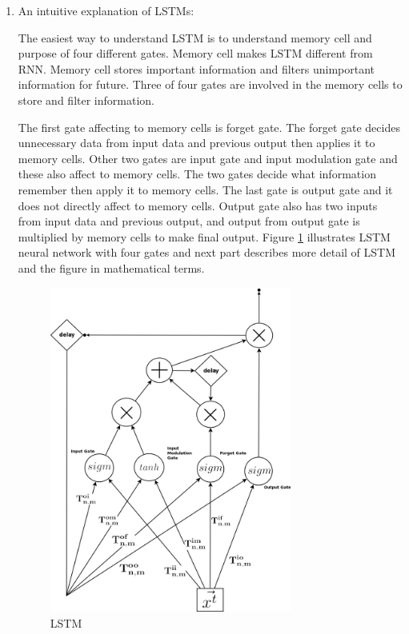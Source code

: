 \documentclass[draft,dvipsnames]{drexel-thesis}
\begin{document}
\begin{thesis}
\begin{enumerate}
\item An intuitive explanation of LSTMs:
	
	The easiest way to understand LSTM is to understand memory cell and purpose of four different gates. Memory cell makes LSTM different from RNN. Memory cell stores important information and filters unimportant information for future. Three of four gates are involved in the memory cells to store and filter information.
		
	The first gate affecting to memory cells is forget gate. The forget gate decides unnecessary data from input data and previous output then applies it to memory cells. Other two gates are input gate and input modulation gate and these also affect to memory cells. The two gates decide what information remember then apply it to memory cells. The last gate is output gate and it does not directly affect to memory cells. Output gate also has two inputs from input data and previous output, and output from output gate is multiplied by memory cells to make final output. Figure \ref{fig:LSTM} illustrates LSTM neural network with four gates and next part describes more detail of LSTM and the figure in mathematical terms.

\begin{figure}[t!]
    \centering
    \includegraphics[width=0.75\textwidth]{pictures/figures/LSTM.png}
    \caption{LSTM}
    \label{fig:LSTM}
\end{figure}
		

\end{enumerate}
\end{thesis}
\end{document}
